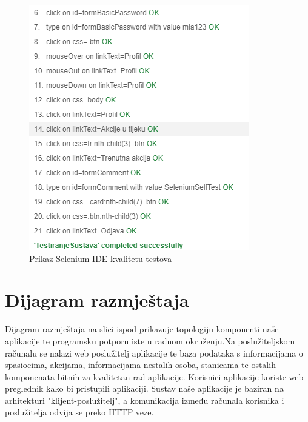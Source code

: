 			\begin{figure}[h!]
				\centering
				\includegraphics[width=\linewidth]{./slike/TestiranjeRezultat.png}
				\caption{Prikaz Selenium IDE kvalitetu testova}
			\end{figure}
		
			\eject
			
		
		\newpage
		\section{Dijagram razmještaja}
			
			
			 {Dijagram razmještaja na slici ispod prikazuje topologiju komponenti naše aplikacije te programsku potporu iste u radnom okruženju.Na poslužiteljskom računalu se nalazi web poslužitelj aplikacije te baza podataka s informacijama o spasiocima, akcijama, informacijama nestalih osoba, stanicama te ostalih komponenata bitnih za kvalitetan rad aplikacije. Korisnici aplikacije koriste web preglednik kako bi pristupili aplikaciji. Sustav naše aplikacije je baziran na arhitekturi "klijent-poslužitelj", a komunikacija između računala korisnika i poslužitelja odvija se preko HTTP veze.}
			 
